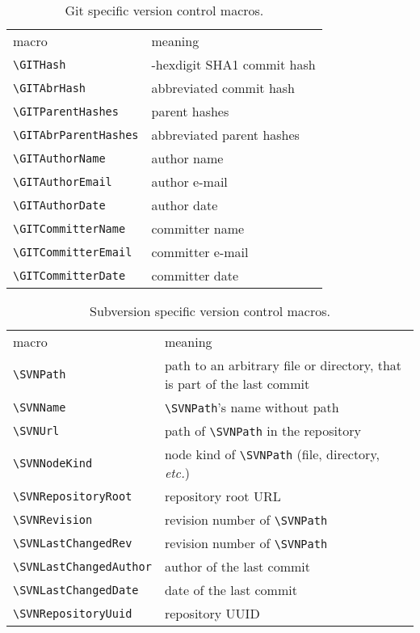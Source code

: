 \documentclass[11pt]{article}
\newcommand*{\full}{\makebox[0pt][r]{${}^{\mbox{\footnotesize\textasteriskcentered}}$}}
\begin{document}
\begin{table}[p]
  \centering\small
  \begin{tabularx}{\textwidth}{p{12em}>{\raggedright\arraybackslash}X}
    macro & meaning\\\addlinespace \toprule\addlinespace
    \verb+\GITHash+ & 40-hexdigit SHA1 commit hash\\
    \verb+\GITAbrHash+ & abbreviated commit hash\\
    \verb+\GITParentHashes+ & parent hashes\\
    \verb+\GITAbrParentHashes+ & abbreviated parent hashes\\
    \verb+\GITAuthorName+ & author name\\
    \verb+\GITAuthorEmail+ & author e-mail\\
    \verb+\GITAuthorDate+ & author date\\
    \verb+\GITCommitterName+ & committer name\\
    \verb+\GITCommitterEmail+ & committer e-mail\\
    \verb+\GITCommitterDate+ & committer date\\
  \end{tabularx}
  \caption{Git specific version control macros.}
  \label{tab:vcGITmacros}
\end{table}

\begin{table}[p]
  \centering\small
  \begin{tabularx}{\textwidth}{p{12em}>{\raggedright\arraybackslash}X}
    macro & meaning\\\addlinespace \toprule\addlinespace
    \full\verb+\SVNPath+ & path to an arbitrary file or directory, that
    is part of the last commit\\
    \full\verb+\SVNName+ & \verb+\SVNPath+'s name without path\\
    \full\verb+\SVNUrl+ & path of \verb+\SVNPath+ in the repository\\
    \full\verb+\SVNNodeKind+ & node kind of \verb+\SVNPath+ (file,
    directory, \emph{etc.})\\
    \full\verb+\SVNRepositoryRoot+ & repository root URL\\
    \verb+\SVNRevision+ & revision number of \verb+\SVNPath+\\
    \verb+\SVNLastChangedRev+ & revision number of \verb+\SVNPath+\\
    \verb+\SVNLastChangedAuthor+ & author of the last commit\\
    \verb+\SVNLastChangedDate+ & date of the last commit\\
    \verb+\SVNRepositoryUuid+ & repository UUID\\
  \end{tabularx}
  \caption{Subversion specific version control macros.}
  \label{tab:vcSVNmacros}
\end{table}
\end{document}
